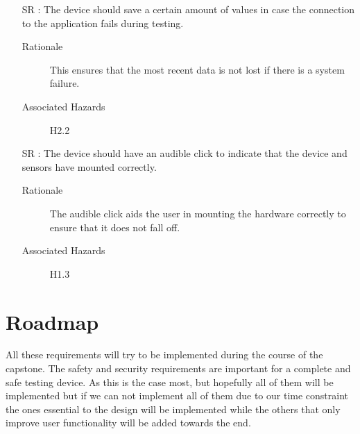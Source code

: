 \documentclass{article}
\newcounter{reqnum} %
\begin{document}
\begin{itemize}
  \item[SR \refstepcounter{reqnum}\thereqnum:] The device should save a certain amount of values in case the connection to the application fails during testing.
    \begin{description} \item[Rationale] This ensures that the most recent data is not lost if there is a system failure.   \end{description}
    \begin{description} \item[Associated Hazards] H2.2  \end{description}
  
  \item[SR \refstepcounter{reqnum}\thereqnum:] The device should have an audible click to indicate that the device and sensors have mounted correctly.
    \begin{description} \item[Rationale] The audible click aids the user in mounting the hardware correctly to ensure that it does not fall off.   \end{description}
    \begin{description} \item[Associated Hazards] H1.3  \end{description}
\end{itemize}


\section{Roadmap}

All these requirements will try to be implemented during the course of the capstone. The safety and security requirements are important for a complete and safe testing device. As this  is the case most, but hopefully all of them will be implemented but if we can not implement all of them due to our time constraint the ones essential to the design will be implemented while the others that only improve user functionality will be added towards the end.
\end{document}
